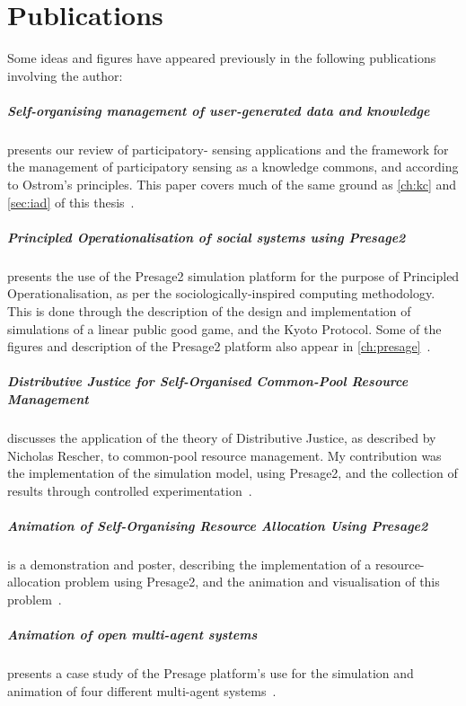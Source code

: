\chapter*{Publications}
Some ideas and figures have appeared previously in the following publications involving the author:

\bigskip

\paragraph{Self-organising management of user-generated data and
knowledge}  presents our review of participatory-
sensing applications and the framework for the management of participatory
sensing as a knowledge commons, and according to Ostrom's principles. This
paper covers much of the same ground as \autoref{ch:kc} and \autoref{sec:iad}
of this thesis~\citep{MacbethKER2014}.

\paragraph{Principled Operationalisation of social systems using
Presage2} presents the use of the Presage2 simulation
platform for the purpose of Principled Operationalisation, as per the
sociologically-inspired computing methodology. This is done through the
description of the design and implementation of simulations of a linear public
good game, and the Kyoto Protocol. Some of the figures and description of the
Presage2 platform also appear in \autoref{ch:presage}~\citep{Macbeth2014}.

\paragraph{Distributive Justice for Self-Organised Common-Pool Resource
Management} discusses the application of the theory of
Distributive Justice, as described by Nicholas Rescher, to common-pool
resource management. My contribution was the implementation of the simulation
model, using Presage2, and the collection of results through controlled
experimentation~\citep{Pitt2014}.

\paragraph{Animation of Self-Organising Resource Allocation Using
Presage2} is a demonstration and poster, describing the
implementation of a resource-allocation problem using Presage2, and the
animation and visualisation of this problem~\citep{Macbeth2012}.

\paragraph{Animation of open multi-agent systems} presents a
case study of the Presage platform's use for the simulation and animation of
four different multi-agent systems~\citep{Pitt2011}.

